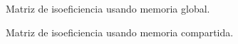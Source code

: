         \begin{figure}[H]
            \centering
            \caption{Matriz de isoeficiencia usando memoria global.}
            \label{fig:histogram_isoeficiency_global}
        \end{figure}  

        \begin{figure}[H]
            \centering
            \caption{Matriz de isoeficiencia usando memoria compartida.}
            \label{fig:histogram_isoeficiency_shared}
        \end{figure}

